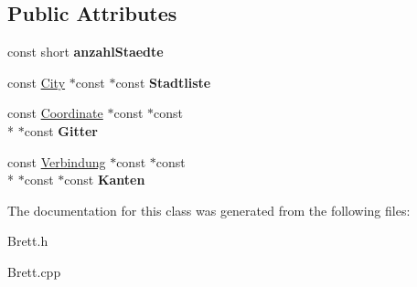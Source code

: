 \subsection*{Public Attributes}
\begin{DoxyCompactItemize}
\item 
\hypertarget{class_brett_a1b42422ecdc5c52503fbb247f1d6f838}{const short {\bfseries anzahl\-Staedte}}\label{class_brett_a1b42422ecdc5c52503fbb247f1d6f838}

\item 
\hypertarget{class_brett_a754988bdc50cc03bdf136e3905df252f}{const \hyperlink{class_city}{City} $\ast$const $\ast$const {\bfseries Stadtliste}}\label{class_brett_a754988bdc50cc03bdf136e3905df252f}

\item 
\hypertarget{class_brett_aed2d07eea45ab2dfc98dfad234c50f43}{const \hyperlink{class_coordinate}{Coordinate} $\ast$const $\ast$const \\*
$\ast$const {\bfseries Gitter}}\label{class_brett_aed2d07eea45ab2dfc98dfad234c50f43}

\item 
\hypertarget{class_brett_a9685bc6076da6752c6c619e3798d04c3}{const \hyperlink{class_verbindung}{Verbindung} $\ast$const $\ast$const \\*
$\ast$const $\ast$const {\bfseries Kanten}}\label{class_brett_a9685bc6076da6752c6c619e3798d04c3}

\end{DoxyCompactItemize}


The documentation for this class was generated from the following files\-:\begin{DoxyCompactItemize}
\item 
Brett.\-h\item 
Brett.\-cpp\end{DoxyCompactItemize}
